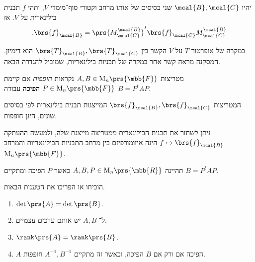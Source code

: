 \documentclass[a4paper,10pt,twoside,openany]{book}
\renewcommand{\Mat}{\mathrm{M}}
\begin{document}
\begin{proposition}\label{proposition:change-of-bases}
יהיו
$\mcal{B},\mcal{C}$
שני בסיסים של אותו מרחב וקטורי סוף־מימדי
$V$,
ותהי
$f$
תבנית בילינארית על
$V$.
אז
\begin{align*}
\text{.} \brs{f}_\mcal{B} = \prs{M^\mcal{B}_\mcal{C}}^t \brs{f}_\mcal{C} M^\mcal{B}_\mcal{C}
\end{align*}
\end{proposition}

במקרה של אופרטור
$T$
על
$V$
הקשר בין
$\brs{T}_\mcal{B}, \brs{T}_\mcal{C}$
הוא דימיון. המסקנה מראה קשר אחר במקרה של תבניות בילינאריות, שמוביל להגדרה הבאה.

\begin{definition}
מטריצות
$A,B \in \Mat_n\prs{\mbb{F}}$
נקראות
\emph{חופפות}
אם קיימת
$P \in \Mat_n\prs{\mbb{F}}$
\textbf{הפיכה}
עבורה
$B = P^t A P$.
\end{definition}

\begin{corollary}
המטריצות
$\brs{f}_\mcal{B}, \brs{f}_\mcal{C}$
המייצגות תבנית בילינארית לפי בסיסים שונים, הינן חופפות.
\end{corollary}

\begin{remark}
ניתן לשחזר את תבנית הבילינארית ממטריצה מייצגת שלה, ולמעשה ההעתקה
$f \mapsto \brs{f}_\mcal{B}$
הינה איזומורפיזם בין מרחב התבניות הבילינאריות והמרחב
$\Mat_n\prs{\mbb{F}}$.
\end{remark}

\begin{exercisechap}
תהיינה
$A,B,P \in \Mat_n\prs{\mbb{R}}$
כאשר
$P$
הפיכה ומתקיים
$B = P^t A P$.

הוכיחו או הפריכו את הטענות הבאות.
\begin{enumerate}
\item $\det\prs{A} = \det\prs{B}$.
\item ל־%
$A,B$
יש אותם ערכים עצמיים.
\item $\rank\prs{A} = \rank\prs{B}$.
\item $A$
הפיכה אם ורק אם
$B$
הפיכה, וכאשר זה מתקיים
$A^{-1}, B^{-1}$
חופפות.
\end{enumerate}
\end{exercisechap}
\end{document}
